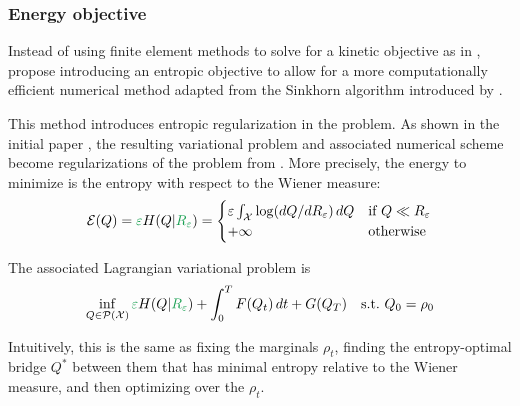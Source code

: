 \documentclass[../report.tex]{subfiles}
\begin{document}
\subsubsection{Energy objective}

Instead of using finite element methods to solve for a kinetic objective as in \cite{benamou:hal-01295299}, \textcite{benamou2018entropy} propose introducing an entropic objective to allow for a more computationally efficient numerical method adapted from the Sinkhorn algorithm introduced by \textcite{cuturi2013sinkhorn}.

This method introduces entropic regularization in the problem. As shown in the initial paper \cite{benamou2018entropy}, the resulting variational problem and associated numerical scheme become regularizations of the problem from \cite{benamou:hal-01295299,benamou2015lagrangian}.
More precisely, the energy to minimize is the entropy with respect to the Wiener measure:
\begin{equation}
	\mathcal{E}(Q) = {\greenfont \epsilon} H(Q | {\greenfont R_\epsilon}) =
	\begin{cases}
	\epsilon \int_\calX \log(dQ/dR_\epsilon)\, dQ
	& \mbox{if } Q \ll R_\epsilon  \\
	+\infty & \mbox{otherwise}
	\end{cases}
\end{equation}

The associated Lagrangian variational problem is
\begin{equation}\label{eq:EntropyLagrangianProblem}
	\inf_{Q\in\calP(\calX)}
	{\greenfont\epsilon} H(Q|{\greenfont R_{\epsilon}}) + \int_0^T F(Q_t)\,dt + G(Q_T)\quad
	\suchthat\ Q_0 = \rho_0
\end{equation}

Intuitively, this is the same as fixing the marginals $\rho_t$, finding the entropy-optimal bridge $Q^*$ between them that has minimal entropy relative to the Wiener measure, and then optimizing over the $\rho_t$.
\end{document}
